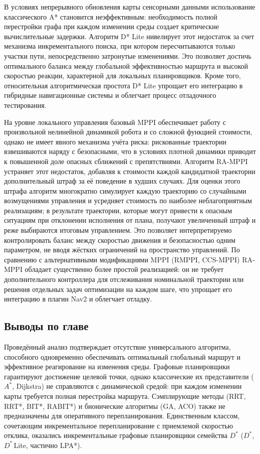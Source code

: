 \documentclass[a4paper,12pt]{extarticle}
\begin{document}
    В условиях непрерывного обновления карты сенсорными данными использование классического
    A* становится неэффективным: необходимость полной перестройки графа при
    каждом изменении среды создает критические вычислительные задержки.
    Алгоритм D* Lite нивелирует этот недостаток за счет механизма инкрементального поиска,
    при котором пересчитываются только участки пути, непосредственно затронутые изменениями.
    Это позволяет достичь оптимального баланса между глобальной эффективностью маршрута и
    высокой скоростью реакции, характерной для локальных планировщиков.
    Кроме того, относительная алгоритмическая простота D* Lite упрощает его
    интеграцию в гибридные навигационные системы и облегчает процесс отладочного тестирования.

    На уровне локального управления базовый MPPI обеспечивает работу с произвольной нелинейной динамикой робота и со сложной функцией стоимости, однако не имеет явного механизма учёта риска: рискованные траектории взвешиваются наряду с безопасными, что в условиях плотной динамики приводит к повышенной доле опасных сближений с препятствиями.
    Алгоритм RA-MPPI устраняет этот недостаток, добавляя к стоимости каждой кандидатной траектории дополнительный штраф за её поведение в худших случаях.
    Для оценки этого штрафа алгоритм многократно симулирует каждую траекторию со случайными возмущениями управления и усредняет стоимость по наиболее неблагоприятным реализациям; в результате траектории, которые могут привести к опасным ситуациям при отклонении исполнения от плана, получают увеличенный штраф и реже выбираются итоговым управлением.
    Это позволяет интерпретируемо контролировать баланс между скоростью движения и безопасностью одним параметром, не вводя жёстких ограничений на пространство управлений.
    По сравнению с альтернативными модификациями MPPI (RMPPI, CCS-MPPI) RA-MPPI обладает существенно более простой реализацией: он не требует дополнительного контроллера для отслеживания номинальной траектории или решения отдельных задач оптимизации на каждом шаге, что упрощает его интеграцию в плагин Nav2 и облегчает отладку.

    \subsection{Выводы по главе}

Проведённый анализ подтверждает отсутствие универсального алгоритма, способного одновременно обеспечивать оптимальный глобальный маршрут и эффективное реагирование на изменения среды. Графовые планировщики гарантируют достижение целевой точки, однако классические их представители ($A^*$, Dijkstra) не справляются с динамической средой: при каждом изменении карты требуется полная перестройка маршрута. Сэмплирующие методы (RRT, RRT*, BIT*, RABIT*) и бионические алгоритмы (GA, ACO) также не предназначены для оперативного перепланирования. Единственным классом, сочетающим инкрементальное перепланирование с приемлемой скоростью отклика, оказались инкрементальные графовые планировщики семейства $D^*$ ($D^*$, $D^*$\,Lite, частично LPA*).
\end{document}
